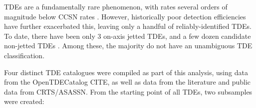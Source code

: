 \documentclass[twocolumn, tighten, linenumbers]{aastex62}
\begin{document}
TDEs are a fundamentally rare phenomenon, with rates several orders of magnitude below CCSN rates \cite{vanVelzen:2017qum}. However, historically poor detection efficiencies have further exacerbated this, leaving only a handful of reliably-identified TDEs. To date, there have been only 3 on-axis jetted TDEs, and a few dozen candidate non-jetted TDEs \cite{Komossa:2015qya, Auchettl:2016qfa}. Among these, the majority do not have an unambiguous TDE classification. 




Four distinct TDE catalogues were compiled as part of this analysis, using data from the OpenTDECatalog CITE, as well as data from the literature and public data from CRTS/ASASSN. From the starting point of all TDEs, two subsamples were created:
\end{document}

